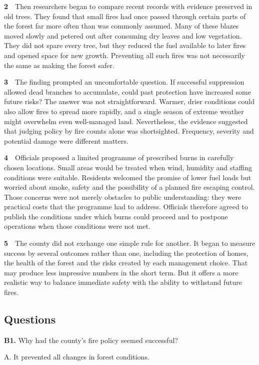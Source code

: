 \documentclass[a4paper,11pt,openany]{report}
\begin{document}
\textbf{2}　Then researchers began to compare recent records with evidence preserved in old trees. They found that small fires had once passed through certain parts of the forest far more often than was commonly assumed. Many of these blazes moved slowly and petered out after consuming dry leaves and low vegetation. They did not spare every tree, but they reduced the fuel available to later fires and opened space for new growth. Preventing all such fires was not necessarily the same as making the forest safer.

\textbf{3}　The finding prompted an uncomfortable question. If successful suppression allowed dead branches to accumulate, could past protection have increased some future risks? The answer was not straightforward. Warmer, drier conditions could also allow fires to spread more rapidly, and a single season of extreme weather might overwhelm even well-managed land. Nevertheless, the evidence suggested that judging policy by fire counts alone was shortsighted. Frequency, severity and potential damage were different matters.

\textbf{4}　Officials proposed a limited programme of prescribed burns in carefully chosen locations. Small areas would be treated when wind, humidity and staffing conditions were suitable. Residents welcomed the promise of lower fuel loads but worried about smoke, safety and the possibility of a planned fire escaping control. Those concerns were not merely obstacles to public understanding: they were practical costs that the programme had to address. Officials therefore agreed to publish the conditions under which burns could proceed and to postpone operations when those conditions were not met.

\textbf{5}　The county did not exchange one simple rule for another. It began to measure success by several outcomes rather than one, including the protection of homes, the health of the forest and the risks created by each management choice. That may produce less impressive numbers in the short term. But it offers a more realistic way to balance immediate safety with the ability to withstand future fires.

\subsection{Questions}\label{questions-1}

\textbf{B1.} Why had the county's fire policy seemed successful?

A. It prevented all changes in forest conditions.
\end{document}
